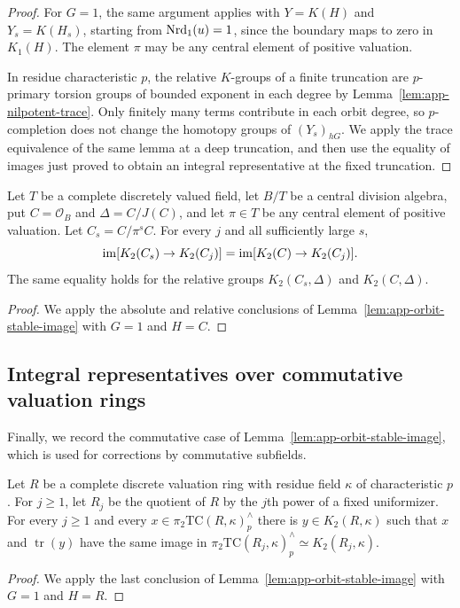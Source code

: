 \begin{proof}
For $G=1$, the same argument applies with $Y=K(H)$ and $Y_s=K(H_s)$, starting from $\operatorname{Nrd}_1(u)=1$, since the boundary maps to zero in $K_1(H)$.
The element $\pi$ may be any central element of positive valuation.

In residue characteristic $p$, the relative $K$-groups of a finite truncation are $p$-primary torsion groups of bounded exponent in each degree by Lemma~\ref{lem:app-nilpotent-trace}.
Only finitely many terms contribute in each orbit degree, so $p$-completion does not change the homotopy groups of $(Y_s)_{hG}$.
We apply the trace equivalence of the same lemma at a deep truncation, and then use the equality of images just proved to obtain an integral representative at the fixed truncation.
\end{proof}

\begin{corollary}
\label{cor:app-integral-cut-stable}
Let $T$ be a complete discretely valued field, let $B/T$ be a central division algebra, put $C=\mathcal O_B$ and $\Delta=C/J(C)$, and let $\pi\in T$ be any central element of positive valuation.
Let $C_s=C/\pi^sC$.
For every $j$ and all sufficiently large $s$,
\[
 \operatorname{im}[K_2(C_s)\to K_2(C_j)]
 =\operatorname{im}[K_2(C)\to K_2(C_j)].
\]
The same equality holds for the relative groups $K_2(C_s,\Delta)$ and $K_2(C,\Delta)$.
\end{corollary}
\begin{proof}
We apply the absolute and relative conclusions of Lemma~\ref{lem:app-orbit-stable-image} with $G=1$ and $H=C$.
\end{proof}

\subsection{Integral representatives over commutative valuation rings}
Finally, we record the commutative case of Lemma~\ref{lem:app-orbit-stable-image}, which is used for corrections by commutative subfields.

\begin{corollary}
\label{cor:app-commutative-cut-representative}
Let $R$ be a complete discrete valuation ring with residue field $\kappa$ of characteristic $p$.
For $j\ge1$, let $R_j$ be the quotient of $R$ by the $j$th power of a fixed uniformizer.
For every $j\ge1$ and every $x\in\pi_2\mathrm{TC}(R,\kappa)^\wedge_p$ there is $y\in K_2(R,\kappa)$ such that $x$ and $\operatorname{tr}(y)$ have the same image in $\pi_2\mathrm{TC}(R_j,\kappa)^\wedge_p\simeq K_2(R_j,\kappa)$.
\end{corollary}
\begin{proof}
We apply the last conclusion of Lemma~\ref{lem:app-orbit-stable-image} with $G=1$ and $H=R$.
\end{proof}
